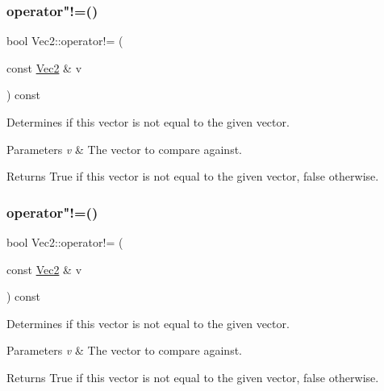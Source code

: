 \subsubsection{\texorpdfstring{operator"!=()}{operator!=()}\hspace{0.1cm}{\footnotesize\ttfamily [1/2]}}
{\footnotesize\ttfamily bool Vec2\+::operator!= (\begin{DoxyParamCaption}\item[{const \hyperlink{classVec2}{Vec2} \&}]{v }\end{DoxyParamCaption}) const\hspace{0.3cm}{\ttfamily [inline]}}

Determines if this vector is not equal to the given vector.


\begin{DoxyParams}{Parameters}
{\em v} & The vector to compare against.\\
\hline
\end{DoxyParams}
\begin{DoxyReturn}{Returns}
True if this vector is not equal to the given vector, false otherwise. 
\end{DoxyReturn}
\mbox{\label{classVec2_a7d0cfd297b55abcb15ff1137cde32edd}} 
\subsubsection{\texorpdfstring{operator"!=()}{operator!=()}\hspace{0.1cm}{\footnotesize\ttfamily [2/2]}}
{\footnotesize\ttfamily bool Vec2\+::operator!= (\begin{DoxyParamCaption}\item[{const \hyperlink{classVec2}{Vec2} \&}]{v }\end{DoxyParamCaption}) const\hspace{0.3cm}{\ttfamily [inline]}}

Determines if this vector is not equal to the given vector.


\begin{DoxyParams}{Parameters}
{\em v} & The vector to compare against.\\
\hline
\end{DoxyParams}
\begin{DoxyReturn}{Returns}
True if this vector is not equal to the given vector, false otherwise. 
\end{DoxyReturn}
\mbox{\label{classVec2_aac30b50a35381a11b76b89ea19dc7f12}} 
